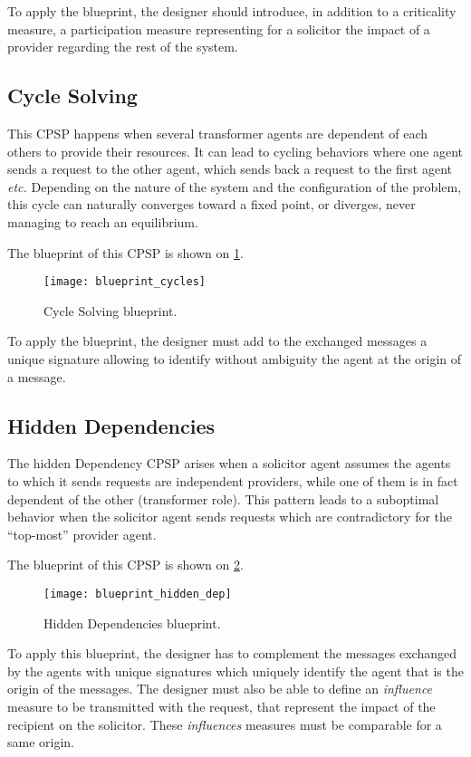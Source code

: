 To apply the blueprint, the designer should introduce, in addition to a criticality measure, a participation measure representing for a solicitor the impact of a provider regarding the rest of the system.

\subsection{Cycle Solving}

This CPSP happens when several transformer agents are dependent of each others to provide their resources. It can lead to cycling behaviors where one agent sends a request to the other agent, which sends back a request to the first agent \emph{etc.} Depending on the nature of the system and the configuration of the problem, this cycle can naturally converges toward a fixed point, or diverges, never managing to reach an equilibrium.

The blueprint of this CPSP is shown on \figurename{} \ref{blueprint_cycles}.

\begin{figure}
\centering
\texttt{[image: blueprint\_cycles]}
\caption{Cycle Solving blueprint.}\label{blueprint_cycles}
\end{figure}

To apply the blueprint, the designer must add to the exchanged messages a unique signature allowing to identify without ambiguity the agent at the origin of a message.

\subsection{Hidden Dependencies}

The hidden Dependency CPSP arises when a solicitor agent assumes the agents to which it sends requests are independent providers, while one of them is in fact dependent of the other (transformer role). This pattern leads to a suboptimal behavior when the solicitor agent sends requests which are contradictory for the \enquote{top-most} provider agent.

The blueprint of this CPSP is shown on \figurename{} \ref{blueprint_hidden_dep}.

\begin{figure}
\centering
\texttt{[image: blueprint\_hidden\_dep]}
\caption{Hidden Dependencies blueprint.}\label{blueprint_hidden_dep}
\end{figure}

To apply this blueprint, the designer has to complement the messages exchanged by the agents with unique signatures which uniquely identify the agent that is the origin of the messages. The designer must also be able to define an \emph{influence} measure to be transmitted with the request, that represent the impact of the recipient on the solicitor. These \emph{influences} measures must be comparable for a same origin.


